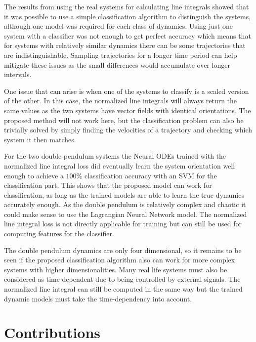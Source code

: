 \documentclass[12pt,a4paper]{book}
\begin{document}
The results from using the real systems for calculating line integrals showed that it was possible to use a simple classification algorithm to distinguish the systems, although one model was required for each class of dynamics. Using just one system with a classifier was not enough to get perfect accuracy which means that for systems with relatively similar dynamics there can be some trajectories that are indistinguishable. Sampling trajectories for a longer time period can help mitigate these issues as the small differences would accumulate over longer intervals.

One issue that can arise is when one of the systems to classify is a scaled version of the other. In this case, the normalized line integrals will always return the same values as the two systems have vector fields with identical orientations. The proposed method will not work here, but the classification problem can also be trivially solved by simply finding the velocities of a trajectory and checking which system it then matches.

For the two double pendulum systems the Neural ODEs trained with the normalized line integral loss did eventually learn the system orientation well enough to achieve a $100 \%$ classification accuracy with an SVM for the classification part. This shows that the proposed model can work for classification, as long as the trained models are able to learn the true dynamics accurately enough. As the double pendulum is relatively complex and chaotic it could make sense to use the Lagrangian Neural Network model. The normalized line integral loss is not directly applicable for training but can still be used for computing features for the classifier.

The double pendulum dynamics are only four dimensional, so it remains to be seen if the proposed classification algorithm also can work for more complex systems with higher dimensionalities. Many real life systems must also be considered as time-dependent due to being controlled by external signals. The normalized line integral can still be computed in the same way but the trained dynamic models must take the time-dependency into account.

\section{Contributions}
\label{sec:Contributions}
\end{document}
